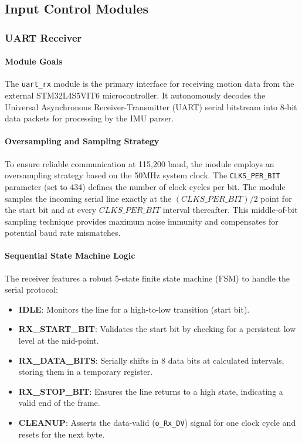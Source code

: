 \documentclass[12pt,a4paper]{article}
\begin{document}
\subsection{Input Control Modules}
\subsubsection{UART Receiver}

\paragraph{Module Goals}
The \texttt{uart\_rx} module is the primary interface for receiving motion data from the external STM32L4S5VIT6 microcontroller. It autonomously decodes the Universal Asynchronous Receiver-Transmitter (UART) serial bitstream into 8-bit data packets for processing by the IMU parser.

\paragraph{Oversampling and Sampling Strategy}
To ensure reliable communication at 115,200 baud, the module employs an oversampling strategy based on the 50MHz system clock. The \texttt{CLKS\_PER\_BIT} parameter (set to 434) defines the number of clock cycles per bit. The module samples the incoming serial line exactly at the $(CLKS\_PER\_BIT)/2$ point for the start bit and at every $CLKS\_PER\_BIT$ interval thereafter. This middle-of-bit sampling technique provides maximum noise immunity and compensates for potential baud rate mismatches.

\paragraph{Sequential State Machine Logic}
The receiver features a robust 5-state finite state machine (FSM) to handle the serial protocol:
\begin{itemize}
    \item \textbf{IDLE}: Monitors the line for a high-to-low transition (start bit).
    \item \textbf{RX\_START\_BIT}: Validates the start bit by checking for a persistent low level at the mid-point.
    \item \textbf{RX\_DATA\_BITS}: Serially shifts in 8 data bits at calculated intervals, storing them in a temporary register.
    \item \textbf{RX\_STOP\_BIT}: Ensures the line returns to a high state, indicating a valid end of the frame.
    \item \textbf{CLEANUP}: Asserts the data-valid (\texttt{o\_Rx\_DV}) signal for one clock cycle and resets for the next byte.
\end{itemize}
\end{document}
